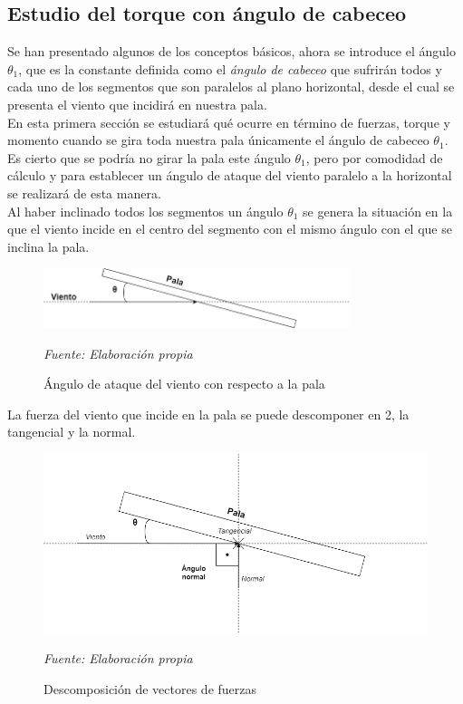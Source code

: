 \subsection{Estudio del torque con ángulo de cabeceo}
\label{section:torque_giro_inicial}

Se han presentado algunos de los conceptos básicos, ahora se introduce el ángulo $ \theta_1 $, que es la constante definida como el \textit{ángulo de cabeceo} que sufrirán todos y cada uno de los segmentos que son paralelos al plano horizontal, desde el cual se presenta el viento que incidirá en nuestra pala.\\


En esta primera sección se estudiará qué ocurre en término de fuerzas, torque y momento cuando se gira toda nuestra pala únicamente el ángulo de cabeceo $ \theta_1 $. \\


Es cierto que se podría no girar la pala este ángulo $ \theta_1 $, pero por comodidad de cálculo y para establecer un ángulo de ataque del viento paralelo a la horizontal se realizará de esta manera.\\


Al haber inclinado todos los segmentos un ángulo $ \theta_1 $ se genera la situación en la que el viento incide en el centro del segmento con el mismo ángulo con el que se inclina la pala. \\

    \textbf{}
    \begin{figure}[H]
    \centering
    \includegraphics[width=0.8\textwidth]{images/dibujo angulo ataque.drawio.png}
    \caption{Ángulo de ataque del viento con respecto a la pala}
    \textit{Fuente: Elaboración propia}
    \label{fig:dibujo_angulo_ataque}
\end{figure}

La fuerza del viento que incide en la pala se puede descomponer en 2, la tangencial y la normal. \\

    \textbf{}
    \begin{figure}[H]
    \centering
    \includegraphics[width=1\textwidth]{images/dibujo fuerzas.drawio.png}
    \caption{Descomposición de vectores de fuerzas}
    \textit{Fuente: Elaboración propia}
    \label{fig:dibujo_fuerzas}
\end{figure}


